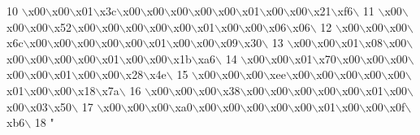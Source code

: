 \begin{DoxyCode}
10 \textcolor{stringliteral}{\(\backslash\)x00\(\backslash\)x00\(\backslash\)x01\(\backslash\)x3c\(\backslash\)x00\(\backslash\)x00\(\backslash\)x00\(\backslash\)x00\(\backslash\)x00\(\backslash\)x01\(\backslash\)x00\(\backslash\)x00\(\backslash\)x21\(\backslash\)xf6\(\backslash\)}
11 \textcolor{stringliteral}{\(\backslash\)x00\(\backslash\)x00\(\backslash\)x00\(\backslash\)x52\(\backslash\)x00\(\backslash\)x00\(\backslash\)x00\(\backslash\)x00\(\backslash\)x00\(\backslash\)x01\(\backslash\)x00\(\backslash\)x00\(\backslash\)x06\(\backslash\)x06\(\backslash\)}
12 \textcolor{stringliteral}{\(\backslash\)x00\(\backslash\)x00\(\backslash\)x00\(\backslash\)x6c\(\backslash\)x00\(\backslash\)x00\(\backslash\)x00\(\backslash\)x00\(\backslash\)x00\(\backslash\)x01\(\backslash\)x00\(\backslash\)x00\(\backslash\)x09\(\backslash\)x30\(\backslash\)}
13 \textcolor{stringliteral}{\(\backslash\)x00\(\backslash\)x00\(\backslash\)x01\(\backslash\)x08\(\backslash\)x00\(\backslash\)x00\(\backslash\)x00\(\backslash\)x00\(\backslash\)x00\(\backslash\)x01\(\backslash\)x00\(\backslash\)x00\(\backslash\)x1b\(\backslash\)xa6\(\backslash\)}
14 \textcolor{stringliteral}{\(\backslash\)x00\(\backslash\)x00\(\backslash\)x01\(\backslash\)x70\(\backslash\)x00\(\backslash\)x00\(\backslash\)x00\(\backslash\)x00\(\backslash\)x00\(\backslash\)x01\(\backslash\)x00\(\backslash\)x00\(\backslash\)x28\(\backslash\)x4e\(\backslash\)}
15 \textcolor{stringliteral}{\(\backslash\)x00\(\backslash\)x00\(\backslash\)x00\(\backslash\)xee\(\backslash\)x00\(\backslash\)x00\(\backslash\)x00\(\backslash\)x00\(\backslash\)x00\(\backslash\)x01\(\backslash\)x00\(\backslash\)x00\(\backslash\)x18\(\backslash\)x7a\(\backslash\)}
16 \textcolor{stringliteral}{\(\backslash\)x00\(\backslash\)x00\(\backslash\)x00\(\backslash\)x38\(\backslash\)x00\(\backslash\)x00\(\backslash\)x00\(\backslash\)x00\(\backslash\)x00\(\backslash\)x01\(\backslash\)x00\(\backslash\)x00\(\backslash\)x03\(\backslash\)x50\(\backslash\)}
17 \textcolor{stringliteral}{\(\backslash\)x00\(\backslash\)x00\(\backslash\)x00\(\backslash\)xa0\(\backslash\)x00\(\backslash\)x00\(\backslash\)x00\(\backslash\)x00\(\backslash\)x00\(\backslash\)x01\(\backslash\)x00\(\backslash\)x00\(\backslash\)x0f\(\backslash\)xb6\(\backslash\)}
18 \textcolor{stringliteral}{"}
\end{DoxyCode}
